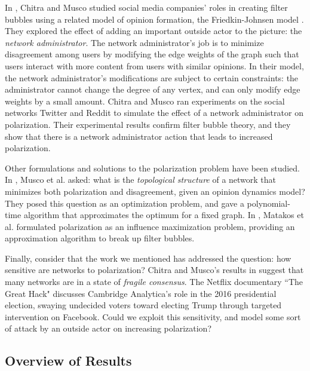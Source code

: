 In \cite{chitra20analyzing}, Chitra and Musco studied social media companies’ roles in creating filter bubbles using a related model of opinion formation, the Friedkin-Johnsen model \cite{fj}. They explored the effect of adding an important outside actor to the picture: the \emph{network administrator}. The network administrator’s job is to minimize disagreement among users by modifying the edge weights of the graph such that users interact with more content from users with similar opinions. In their model, the network administrator’s modifications are subject to certain constraints: the administrator cannot change the degree of any vertex, and can only modify edge weights by a small amount. Chitra and Musco ran experiments on the social networks Twitter and Reddit to simulate the effect of a network administrator on polarization. Their experimental results confirm filter bubble theory, and they show that there is a network administrator action that leads to increased polarization.

Other formulations and solutions to the polarization problem have been studied. In \cite{muscomusco}, Musco et al. asked: what is the \emph{topological structure} of a network that minimizes both polarization and disagreement, given an opinion dynamics model? They posed this question as an optimization problem, and gave a polynomial-time algorithm that approximates the optimum for a fixed graph. In \cite{algorithmfilterbubbles}, Matakos et al. formulated polarization as an influence maximization problem, providing an approximation algorithm to break up filter bubbles. 

Finally, consider that the work we mentioned has addressed the question: how sensitive are networks to polarization? Chitra and Musco's results in \cite{chitra20analyzing} suggest that many networks are in a state of \emph{fragile consensus}. The Netflix documentary ``The Great Hack" \cite{Netflix} discusses Cambridge Analytica’s role in the 2016 presidential election, swaying undecided voters toward electing Trump through targeted intervention on Facebook. Could we exploit this sensitivity, and model some sort of attack by an outside actor on increasing polarization? 


\subsection{Overview of Results}

